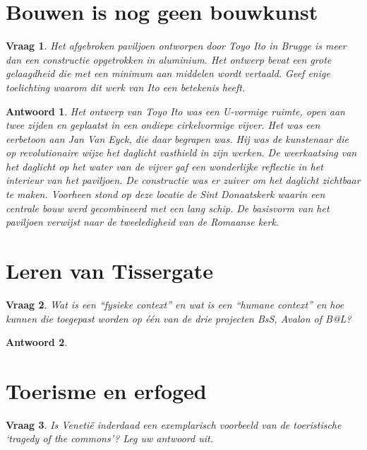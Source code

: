 \documentclass{article}
\theoremstyle{plain}
\newtheorem{question}{Vraag}
\theoremstyle{nonumberplain}
\newtheorem{answer}{Antwoord}
\begin{document}
\section{Bouwen is nog geen bouwkunst}

\begin{question}
Het afgebroken paviljoen ontworpen door Toyo Ito in Brugge is meer dan een
constructie opgetrokken in aluminium. Het ontwerp bevat een grote gelaagdheid
die met een minimum aan middelen wordt vertaald. Geef enige toelichting waarom
dit werk van Ito een betekenis heeft.
\end{question}

\begin{answer}

Het ontwerp van Toyo Ito was een U-vormige ruimte, open aan twee zijden en
geplaatst in een ondiepe cirkelvormige vijver. Het was een eerbetoon aan Jan Van
Eyck, die daar begrapen was. Hij was de kunstenaar die op revolutionaire wijze
het daglicht vasthield in zijn werken. De weerkaatsing van het daglicht op het
water van de vijver gaf een wonderlijke reflectie in het interieur van het
paviljoen. De constructie was er zuiver om het daglicht zichtbaar te maken.
Voorheen stond op deze locatie de Sint Donaatskerk waarin een centrale bouw werd
gecombineerd met een lang schip. De basisvorm van het paviljoen verwijst naar de
tweeledigheid van de Romaanse kerk.

\end{answer}

\section{Leren van Tissergate}

\begin{question}
Wat is een “fysieke context” en wat is een “humane context” en hoe kunnen die
toegepast worden op één van de drie projecten BsS, Avalon of B@L?
\end{question}

\begin{answer}

\end{answer}

\section{Toerisme en erfoged}

\begin{question}
Is Venetië inderdaad een exemplarisch voorbeeld van de toeristische ‘tragedy of
the commons’? Leg uw antwoord uit.
\end{question}
\end{document}
